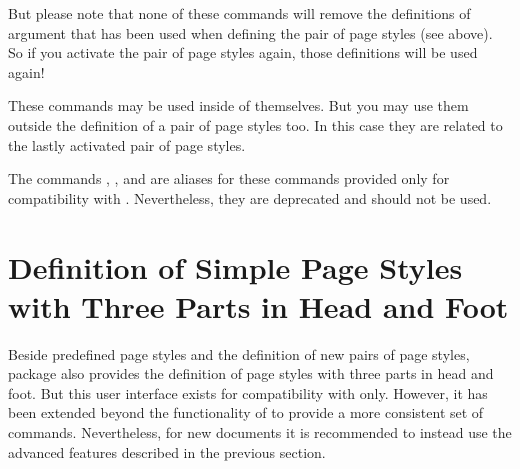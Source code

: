But please note that none of these commands will remove
the definitions of argument  that has been used when
defining the pair of page styles (see above). So if you activate the pair of
page styles again, those definitions will be used again!

These commands may be used inside of  themselves. But you
may use them outside the definition of a pair of page styles too. In this case
they are related to the lastly activated pair of page styles.

%
%
%
The commands , , and
 are aliases for these commands provided only for
compatibility with . Nevertheless, they are deprecated and
should not be used.%
%
\EndIndexGroup


\section{Definition of Simple Page Styles with Three Parts in Head and Foot }

Beside predefined page styles and the definition of new pairs of page styles,
package  also provides the definition of page styles
with three parts in head and foot. But this user interface exists for
compatibility with  only. However, it has been extended
beyond the functionality of  to provide a more consistent
set of commands. Nevertheless, for new documents it is recommended to instead
use the advanced features described in the previous section.

